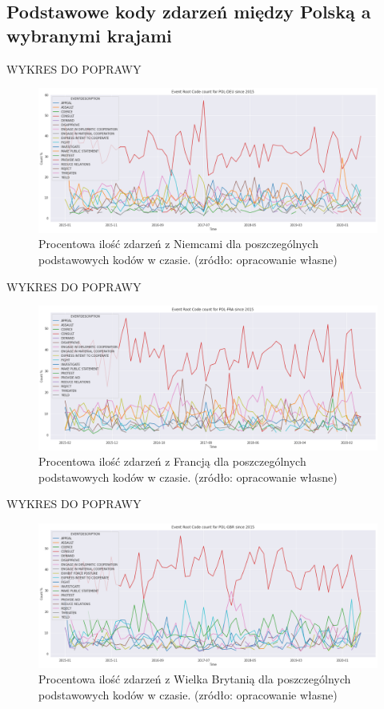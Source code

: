 \documentclass[11pt]{report}
\begin{document}
 \subsection{Podstawowe kody zdarzeń między Polską a wybranymi krajami} 
  	   WYKRES DO POPRAWY
  	\begin{figure}[ht]
	\centering
	\includegraphics[width=0.8 \textwidth]{fig/PL/POLDEUERCperc.png}
	\caption{Procentowa ilość zdarzeń z Niemcami dla poszczególnych podstawowych kodów w czasie. (zródło: opracowanie własne)}
	\label{fig:PLDEUERC}
	\end{figure}
 
   	   WYKRES DO POPRAWY
  	\begin{figure}[ht]
	\centering
	\includegraphics[width=0.8 \textwidth]{fig/PL/POLFRAERCperc.png}
	\caption{Procentowa ilość zdarzeń z Francją dla poszczególnych podstawowych kodów w czasie. (zródło: opracowanie własne)}
	\label{fig:PLFRAERC}
	\end{figure}
	
	   	   WYKRES DO POPRAWY
  	\begin{figure}[ht]
	\centering
	\includegraphics[width=0.8 \textwidth]{fig/PL/POLGBRERCperc.png}
	\caption{Procentowa ilość zdarzeń z Wielka Brytanią dla poszczególnych podstawowych kodów w czasie. (zródło: opracowanie własne)}
	\label{fig:PLGBRERC}
	\end{figure}
	
\end{document}
